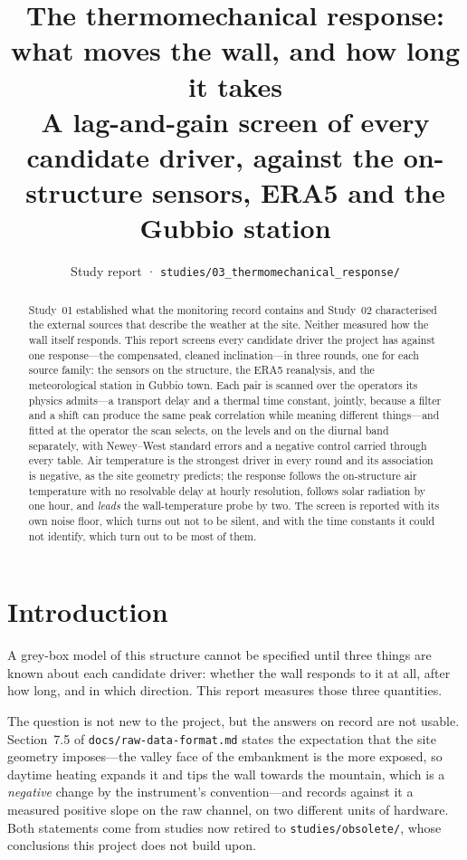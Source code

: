 \documentclass[11pt,a4paper]{article}
\title{\vspace{-1.2cm}\textbf{The thermomechanical response: what moves the wall,
and how long it takes}\\[2mm] \large A lag-and-gain screen of every candidate
driver, against the on-structure sensors, ERA5 and the Gubbio station}
\author{Study report · \texttt{studies/03\_thermomechanical\_response/}}
\date{}
\begin{document}
\maketitle
\thispagestyle{fancy}

\begin{abstract}
\noindent
Study~01 established what the monitoring record contains and Study~02
characterised the external sources that describe the weather at the site.
Neither measured how the wall itself responds. This report screens every
candidate driver the project has against one response---the compensated,
cleaned inclination---in three rounds, one for each source family: the sensors
on the structure, the ERA5 reanalysis, and the meteorological station in Gubbio
town. Each pair is scanned over the operators its physics admits---a transport
delay and a thermal time constant, jointly, because a filter and a shift can
produce the same peak correlation while meaning different things---and fitted at
the operator the scan selects, on the levels and on the diurnal band separately,
with Newey--West standard errors and a negative control carried through every
table.
Air temperature is the strongest driver in every round and its association is
negative, as the site geometry predicts; the response follows the on-structure
air temperature with no resolvable delay at hourly resolution, follows solar
radiation by one hour, and \emph{leads} the wall-temperature probe by two. The
screen is reported with its own noise floor, which turns out not to be silent,
and with the time constants it could not identify, which turn out to be most of
them.
\end{abstract}

\tableofcontents

\section{Introduction}
\label{sec:introduction}

A grey-box model of this structure cannot be specified until three things are
known about each candidate driver: whether the wall responds to it at all, after
how long, and in which direction. This report measures those three quantities.

The question is not new to the project, but the answers on record are not
usable. Section~7.5 of \texttt{docs/raw-data-format.md} states the expectation
that the site geometry imposes---the valley face of the embankment is the more
exposed, so daytime heating expands it and tips the wall towards the mountain,
which is a \emph{negative} change by the instrument's convention---and records
against it a measured positive slope on the raw channel, on two different units
of hardware. Both statements come from studies now retired to
\texttt{studies/obsolete/}, whose conclusions this project does not build upon.
\end{document}
